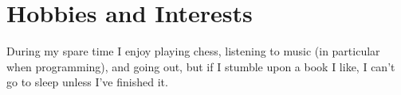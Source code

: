 \documentclass[a4paper,10pt]{article} %
\begin{document}


\bigskip

\section{Hobbies and Interests}
During my spare time I enjoy playing chess, listening to music (in particular when programming), and going out, but if I stumble upon a book I like, I can't go to sleep unless I've finished it.
\end{document}
